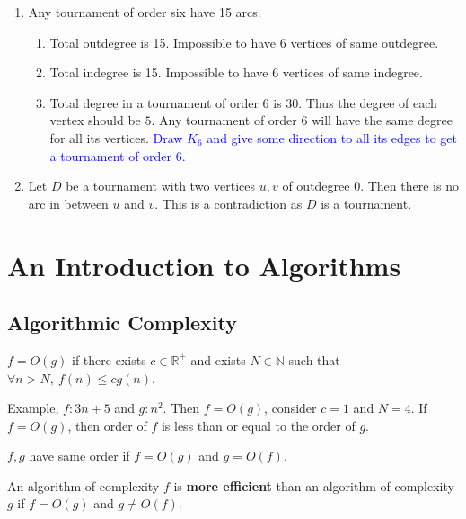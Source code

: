 \begin{enumerate}
\begin{enumerate*}
	\end{enumerate*}
	\item Any tournament of order six have 15 arcs.
	\begin{enumerate}
		\item Total outdegree is 15. Impossible to have 6 vertices of same outdegree.
		\item Total indegree is 15. Impossible to have 6 vertices of same indegree.
		\item Total degree in a tournament of order 6 is 30. Thus the degree of each vertex should be $5$. Any tournament of order 6 will have the same degree for all its vertices. \textcolor{blue}{Draw $K_6$ and give some direction to all its edges to get a tournament of order 6.}
	\end{enumerate}
	\item Let $D$ be a tournament with two vertices $u,v$ of outdegree 0. Then there is no arc in between $u$ and $v$. This is a contradiction as $D$ is a tournament.
\end{enumerate}

\section{An Introduction to Algorithms}
\subsection{Algorithmic Complexity}
\begin{definition}
	$f = O(g)$ if there exists $c \in \mathbb{R}^+$ and exists $N \in \mathbb{N}$ such that $\forall n > N,\ f(n) \le cg(n)$.
\end{definition}
Example, $f : 3n+5$ and $g : n^2$. Then $f = O(g)$, consider $c = 1$ and $N = 4$. If $f = O(g)$, then order of $f$ is less than or equal to the order of $g$.

\begin{remark}
	$f,g$ have same order if $f = O(g)$ and $g = O(f)$.
\end{remark}

An algorithm of complexity $f$ is \textbf{more efficient} than an algorithm of complexity $g$ if $f = O(g)$ and $g \ne O(f)$.\\

